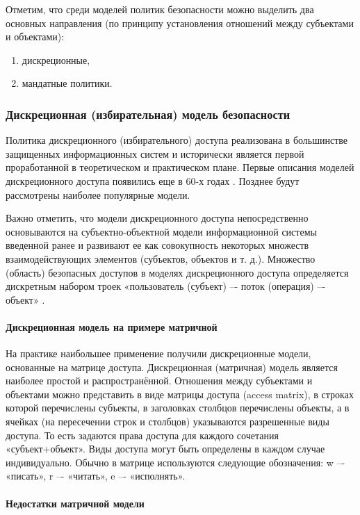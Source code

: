 Отметим, что среди моделей политик безопасности можно выделить два основных направления (по принципу 
установления отношений между субъектами и объектами):
\begin{enumerate}
    \item дискреционные,
    \item мандатные политики.
\end{enumerate}

\subsubsection{Дискреционная (избирательная) модель безопасности}

Политика дискреционного (избирательного) доступа реализована в большинстве защищенных информационных 
систем и исторически является первой проработанной в теоретическом и практическом плане. Первые описания 
моделей дискреционного доступа появились еще в 60-х годах \autocite{URFULecture10Models}. Позднее 
будут рассмотрены наиболее популярные модели.

Важно отметить, что модели дискреционного доступа непосредственно основываются на субъектно-объектной 
модели информационной системы введенной ранее и развивают ее как совокупность некоторых множеств 
взаимодействующих элементов (субъектов, объектов и т. д.). Множество (область) безопасных доступов 
в моделях дискреционного доступа определяется дискретным набором троек «пользователь (субъект) –- поток
(операция) –- объект» \autocite{URFULecture10Models}.

\paragraph{Дискреционная модель на примере матричной}

На практике наибольшее применение получили дискреционные модели, основанные на матрице доступа. 
Дискреционная (матричная) модель является наиболее простой и распространённой. Отношения между 
субъектами и объектами можно представить в виде матрицы доступа (access matrix), в строках которой 
перечислены субъекты, в заголовках столбцов перечислены объекты, а в ячейках (на пересечении строк 
и столбцов) указываются разрешенные виды доступа. То есть задаются права доступа для каждого сочетания 
«субъект+объект». Виды доступа могут быть определены в каждом случае индивидуально. Обычно в матрице 
используются следующие обозначения: w –- «писать», r –- «читать», e –- «исполнять».

\paragraph{Недостатки матричной модели}

